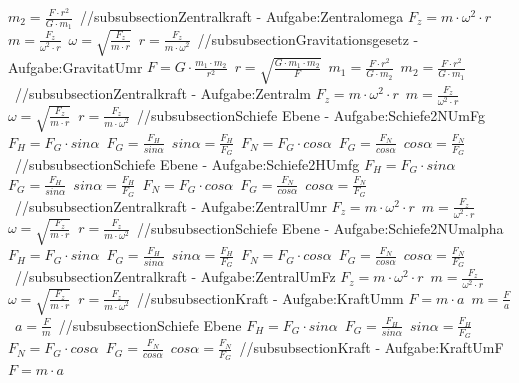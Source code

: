 $ m_{2}  =  \frac{F\cdot r^{2} }{G\cdot m_{1} } $\ 
//subsubsection{Zentralkraft - Aufgabe:Zentralomega} 
$ F_{z}  = m\cdot \omega ^{2} \cdot r $\ 
$ m = \frac{ F_{z} }{\omega ^{2} \cdot r} $\ 
$ \omega  = \sqrt{\frac{ F_{z} }{m\cdot r}} $\ 
$ r = \frac{ F_{z} }{m\cdot \omega ^{2} } $\ 
//subsubsection{Gravitationsgesetz - Aufgabe:GravitatUmr} 
$ F = G \cdot  \frac{m_{1} \cdot m_{2} }{  r^{2} } $\ 
$ r = \sqrt{\frac{G\cdot m_{1} \cdot m_{2} }{   F}} $\ 
$ m_{1}  =  \frac{F\cdot r^{2} }{G\cdot m_{2} } $\ 
$ m_{2}  =  \frac{F\cdot r^{2} }{G\cdot m_{1} } $\ 
//subsubsection{Zentralkraft - Aufgabe:Zentralm} 
$ F_{z}  = m\cdot \omega ^{2} \cdot r $\ 
$ m = \frac{ F_{z} }{\omega ^{2} \cdot r} $\ 
$ \omega  = \sqrt{\frac{ F_{z} }{m\cdot r}} $\ 
$ r = \frac{ F_{z} }{m\cdot \omega ^{2} } $\ 
//subsubsection{Schiefe Ebene - Aufgabe:Schiefe2NUmFg} 
$ F_{H}  = F_{G} \cdot sin \alpha $\ 
$ F_{G}  = \frac{ F_{H} }{sin \alpha } $\ 
$ sin \alpha  = \frac{F_{H} }{F_{G} } $\ 
$ F_{N}  = F_{G} \cdot cos \alpha $\ 
$ F_{G}  = \frac{ F_{N} }{cos \alpha } $\ 
$ cos \alpha  = \frac{F_{N} }{F_{G} } $\ 
//subsubsection{Schiefe Ebene - Aufgabe:Schiefe2HUmfg} 
$ F_{H}  = F_{G} \cdot sin \alpha $\ 
$ F_{G}  = \frac{ F_{H} }{sin \alpha } $\ 
$ sin \alpha  = \frac{F_{H} }{F_{G} } $\ 
$ F_{N}  = F_{G} \cdot cos \alpha $\ 
$ F_{G}  = \frac{ F_{N} }{cos \alpha } $\ 
$ cos \alpha  = \frac{F_{N} }{F_{G} } $\ 
//subsubsection{Zentralkraft - Aufgabe:ZentralUmr} 
$ F_{z}  = m\cdot \omega ^{2} \cdot r $\ 
$ m = \frac{ F_{z} }{\omega ^{2} \cdot r} $\ 
$ \omega  = \sqrt{\frac{ F_{z} }{m\cdot r}} $\ 
$ r = \frac{ F_{z} }{m\cdot \omega ^{2} } $\ 
//subsubsection{Schiefe Ebene - Aufgabe:Schiefe2NUmalpha} 
$ F_{H}  = F_{G} \cdot sin \alpha $\ 
$ F_{G}  = \frac{ F_{H} }{sin \alpha } $\ 
$ sin \alpha  = \frac{F_{H} }{F_{G} } $\ 
$ F_{N}  = F_{G} \cdot cos \alpha $\ 
$ F_{G}  = \frac{ F_{N} }{cos \alpha } $\ 
$ cos \alpha  = \frac{F_{N} }{F_{G} } $\ 
//subsubsection{Zentralkraft - Aufgabe:ZentralUmFz} 
$ F_{z}  = m\cdot \omega ^{2} \cdot r $\ 
$ m = \frac{ F_{z} }{\omega ^{2} \cdot r} $\ 
$ \omega  = \sqrt{\frac{ F_{z} }{m\cdot r}} $\ 
$ r = \frac{ F_{z} }{m\cdot \omega ^{2} } $\ 
//subsubsection{Kraft - Aufgabe:KraftUmm} 
$ F = m\cdot a $\ 
$ m = \frac{F}{a} $\ 
$ a = \frac{F}{m} $\ 
//subsubsection{Schiefe Ebene} 
$ F_{H}  = F_{G} \cdot sin \alpha $\ 
$ F_{G}  = \frac{ F_{H} }{sin \alpha } $\ 
$ sin \alpha  = \frac{F_{H} }{F_{G} } $\ 
$ F_{N}  = F_{G} \cdot cos \alpha $\ 
$ F_{G}  = \frac{ F_{N} }{cos \alpha } $\ 
$ cos \alpha  = \frac{F_{N} }{F_{G} } $\ 
//subsubsection{Kraft - Aufgabe:KraftUmF} 
$ F = m\cdot a $\ 
